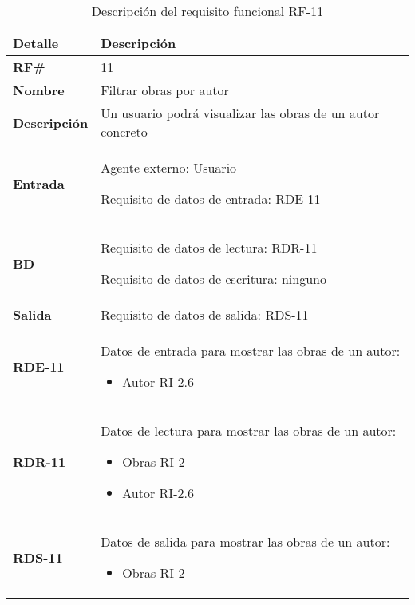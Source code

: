 \begin{table}[H]
    \centering
    \begin{tabular}{|p{3cm}|p{8cm}|}
        \hline
        \rowcolor{lightgray}
        \textbf{Detalle} & \textbf{Descripción} \\
        \hline
        \textbf{RF\#} & 11 \\
        \hline
        \textbf{Nombre} & Filtrar obras por autor \\
        \hline
        \textbf{Descripción} & Un usuario podrá visualizar las obras de un autor
        concreto \\
        \hline
        \textbf{Entrada} &
        Agente externo: Usuario
        
        Requisito de datos de entrada: RDE-11 \\
        \hline
        \textbf{BD} &
        Requisito de datos de lectura: RDR-11
        
        Requisito de datos de escritura: ninguno \\
        \hline
        \textbf{Salida} & Requisito de datos de salida: RDS-11 \\
        \hline
        \textbf{RDE-11} & Datos de entrada para mostrar las obras de un autor:
            \begin{itemize}
                \item Autor RI-2.6
            \end{itemize} \\
        \hline
        \textbf{RDR-11} & Datos de lectura para mostrar las obras de un autor:
            \begin{itemize}
                \item Obras RI-2
                \item Autor RI-2.6
            \end{itemize} \\
        \hline
        \textbf{RDS-11} & Datos de salida para mostrar las obras de un autor:
            \begin{itemize}
                \item Obras RI-2
            \end{itemize} \\
        \hline
    \end{tabular}
    \caption{Descripción del requisito funcional RF-11}
    \label{tab:rf-11}
\end{table}

